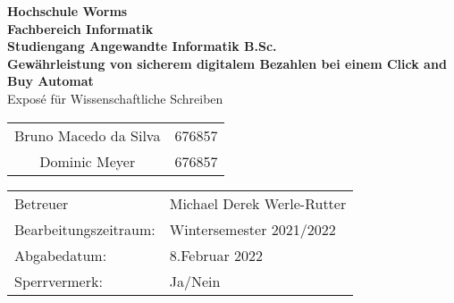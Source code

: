 \begin{titlepage}
    \vspace*{2mm}
    \begin{center}
        \Large
        \textbf{Hochschule Worms}\\
        \textbf{Fachbereich Informatik}\\
        \textbf{Studiengang Angewandte Informatik B.Sc.}\\
        \vspace{1cm}
        \textbf{Gewährleistung von sicherem digitalem Bezahlen bei einem Click and Buy Automat}\\
        \vspace{1cm}
        \large
        Exposé für Wissenschaftliche Schreiben\\
        \vspace{1cm}
        \begin {table}[ht]
            \centering
            \begin{tabular}{c c}
                Bruno Macedo da Silva   & 676857 \\
                Dominic Meyer           & 676857 \\
            \end{tabular}
        \end {table}
        \vspace{3cm}
        \large
        \vspace{4cm}
         \begin {table}[ht]
             \centering
             \begin{tabular}{l l}
                Betreuer                & Michael Derek Werle-Rutter \\
                Bearbeitungszeitraum:   & Wintersemester 2021/2022 \\
                Abgabedatum:            & 8.Februar 2022 \\
                Sperrvermerk:           & Ja/Nein \\
             \end{tabular}
         \end {table}
    \end{center}
    \normalsize
    \vfill
 


\end{titlepage}